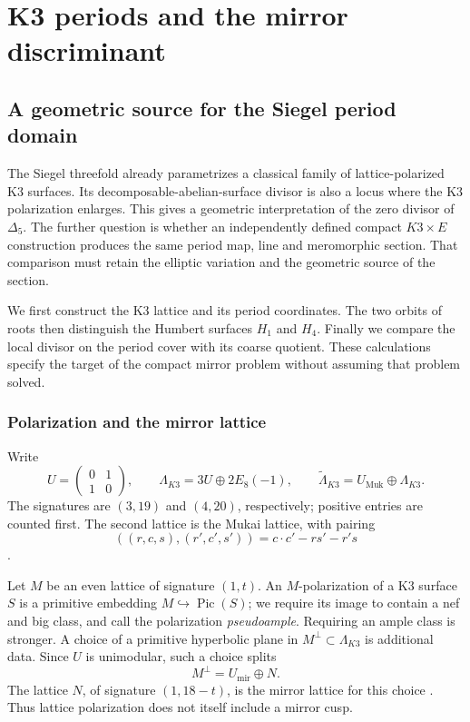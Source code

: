 \chapter{K3 periods and the mirror discriminant}
\label{ch:view4-mirror}

\section{A geometric source for the Siegel period domain}
\label{sec:view4-mirror-discriminant}

The Siegel threefold already parametrizes a classical family of
lattice-polarized K3 surfaces. Its decomposable-abelian-surface divisor
is also a locus where the K3 polarization enlarges. This gives a
geometric interpretation of the zero divisor of \(\Delta_5\).
The further question is whether an independently defined compact
\(K3\times E\) construction produces the same period map, line and
meromorphic section. That comparison must retain the elliptic
variation and the geometric source of the section.

We first construct the K3 lattice and its period coordinates. The two
orbits of roots then distinguish the Humbert surfaces \(H_1\) and
\(H_4\). Finally we compare the local divisor on the period cover
with its coarse quotient. These calculations specify the target of
the compact mirror problem without assuming that problem solved.

\subsection{Polarization and the mirror lattice}
\label{subsec:k3-mirror-period}

Write
\[
 U=\begin{pmatrix}0&1\\1&0\end{pmatrix},\qquad
 \Lambda_{K3}=3U\oplus2E_8(-1),\qquad
 \widetilde\Lambda_{K3}=U_{\mathrm{Muk}}\oplus\Lambda_{K3}.
\]
The signatures are \((3,19)\) and \((4,20)\), respectively;
positive entries are counted first. The second lattice is the Mukai
lattice, with pairing
\[
 ((r,c,s),(r',c',s'))=c\cdot c'-rs'-r's
\]
\cite{Mukai1984,Mukai1987}.

Let \(M\) be an even lattice of signature \((1,t)\).
An \(M\)-polarization of a K3 surface \(S\) is a primitive embedding
\(M\hookrightarrow\operatorname{Pic}(S)\); we require its image to
contain a nef and big class, and call the polarization
\emph{pseudoample}. Requiring an ample class is stronger. A choice
of a primitive hyperbolic plane in \(M^\perp\subset\Lambda_{K3}\)
is additional data. Since \(U\) is unimodular, such a choice splits
\[
 M^\perp=U_{\mathrm{mir}}\oplus N.
\]
The lattice \(N\), of signature \((1,18-t)\), is the mirror lattice
for this choice \cite[\S\S1--3, 5]{DolgachevMirrorLP}.
Thus lattice polarization does not itself include a mirror cusp.

